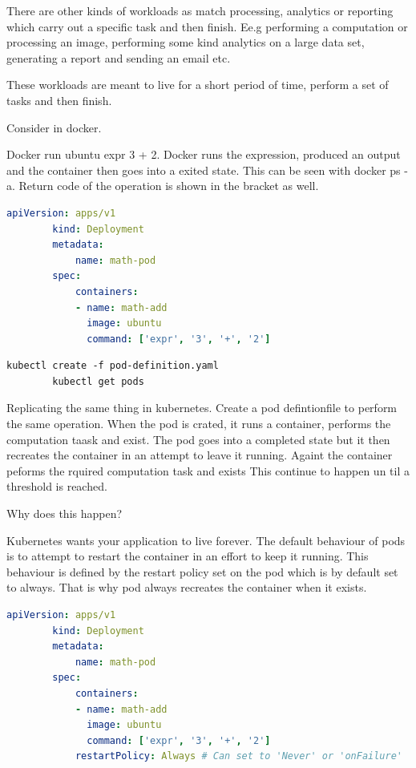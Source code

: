 \documentclass[11pt]{book}
\begin{document}
    There are other kinds of workloads as match processing, analytics or reporting which carry out a specific task and then finish.
    Ee.g performing a computation or processing an image, performing some kind analytics on a large data set, generating a report and sending an email etc.

    These workloads are meant to live for a short period of time, perform a set of tasks and then finish.


    Consider in docker.

    Docker run ubuntu expr 3 + 2.
    Docker runs the expression, produced an output and the container then goes into a exited state.
    This can be seen with docker ps -a. Return code of the operation is shown in the bracket as well.

    \begin{lstlisting}[language=yaml, caption={Example}]
        apiVersion: apps/v1
        kind: Deployment
        metadata:
            name: math-pod
        spec:
            containers:
            - name: math-add
              image: ubuntu
              command: ['expr', '3', '+', '2']
    \end{lstlisting}

    \begin{lstlisting}[language=terminal, caption={Sumnmary of commands}]
        kubectl create -f pod-definition.yaml
        kubectl get pods
    \end{lstlisting}

    Replicating the same thing in kubernetes.
    Create a pod defintionfile to perform the same operation.
    When the pod is crated, it runs a container, performs the computation taask and exist.
    The pod goes into a completed state but it then recreates the container in an attempt to leave it running.
    Againt the container peforms the rquired computation task and exists
    This continue to happen un til a threshold is reached.

    Why does this happen?

    Kubernetes wants your application to live forever.
    The default behaviour of pods is to attempt to restart the container in an effort to keep it running.
    This behaviour is defined by the restart policy set on the pod which is by default set to always.
    That is why pod always recreates the container when it exists.

    \begin{lstlisting}[language=yaml, caption={Example}]
        apiVersion: apps/v1
        kind: Deployment
        metadata:
            name: math-pod
        spec:
            containers:
            - name: math-add
              image: ubuntu
              command: ['expr', '3', '+', '2']
            restartPolicy: Always # Can set to 'Never' or 'onFailure'
    \end{lstlisting}
\end{document}
